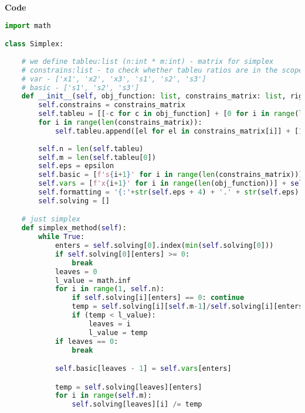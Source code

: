 \documentclass[12pt, legalpaper]{exam}
\begin{document}
\noindent
{}




\vspace{24pt}
\noindent    
\newpage
\textbf{Code}

\begin{lstlisting}[language=Python, caption=Программа на Python, label=lst:python-code]
import math

class Simplex:
    
    # we define tableu:list (n:int * m:int) - matrix for simplex
    # constrains:list - to check whether tableu ratios are in the scope of them
    # var - ['x1', 'x2', 'x3', 's1', 's2', 's3']
    # basic - ['s1', 's2', 's3']
    def __init__(self, obj_function: list, constrains_matrix: list, right_hand_side_num: list, epsilon:int):
        self.constrains = constrains_matrix
        self.tableu = [[-c for c in obj_function] + [0 for i in range(len(constrains_matrix))] + [0]]
        for i in range(len(constrains_matrix)):
            self.tableu.append([el for el in constrains_matrix[i]] + [1 if i == j else 0 for j in range(len(constrains_matrix))] + [right_hand_side_num[i]])
        
        self.n = len(self.tableu)
        self.m = len(self.tableu[0])
        self.eps = epsilon
        self.basic = [f's{i+1}' for i in range(len(constrains_matrix))]
        self.vars = [f'x{i+1}' for i in range(len(obj_function))] + self.basic
        self.formatting = '{:'+str(self.eps + 4) + '.' + str(self.eps) + 'f}'
        self.solving = []

    # just simplex 
    def simplex_method(self):
        while True:
            enters = self.solving[0].index(min(self.solving[0]))
            if self.solving[0][enters] >= 0:
                break
            leaves = 0
            l_value = math.inf
            for i in range(1, self.n):
                if self.solving[i][enters] == 0: continue
                temp = self.solving[i][self.m-1]/self.solving[i][enters]
                if (temp < l_value):
                    leaves = i
                    l_value = temp
            if leaves == 0:
                break

            self.basic[leaves - 1] = self.vars[enters]

            temp = self.solving[leaves][enters]
            for i in range(self.m):
                self.solving[leaves][i] /= temp
        

\end{lstlisting}
\end{document}
